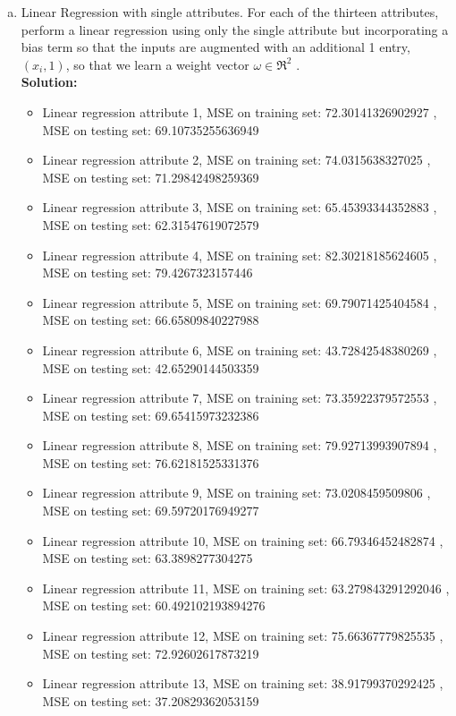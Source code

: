 \documentclass[A4,12pt]{article}
\begin{document}
\begin{enumerate}[4.]
\begin{enumerate}[a.]
    \item Linear Regression with single attributes. For each of the thirteen attributes, perform a linear regression using only the single attribute but incorporating a bias term so that the inputs are augmented with an additional 1 entry, $(x_i , 1)$, so that we learn a weight vector $\omega \in \Re^2$ .\\
    \textbf{Solution:} 
      \begin{itemize}
        \item Linear regression attribute 1, MSE on training set: 72.30141326902927 , MSE on testing set:  69.10735255636949
        \item Linear regression attribute 2, MSE on training set: 74.0315638327025 , MSE on testing set: 71.29842498259369
        \item Linear regression attribute 3, MSE on training set: 65.45393344352883 , MSE on testing set: 62.31547619072579
        \item Linear regression attribute 4, MSE on training set: 82.30218185624605 , MSE on testing set: 79.4267323157446 
        \item Linear regression attribute 5, MSE on training set: 69.79071425404584 , MSE on testing set: 66.65809840227988 
        \item Linear regression attribute 6, MSE on training set: 43.72842548380269 , MSE on testing set: 42.65290144503359 
        \item Linear regression attribute 7, MSE on training set: 73.35922379572553 , MSE on testing set: 69.65415973232386 
        \item Linear regression attribute 8, MSE on training set: 79.92713993907894 , MSE on testing set: 76.62181525331376 
        \item Linear regression attribute 9, MSE on training set: 73.0208459509806 , MSE on testing set:  69.59720176949277 
        \item Linear regression attribute 10, MSE on training set: 66.79346452482874 , MSE on testing set: 63.3898277304275 
        \item Linear regression attribute 11, MSE on training set: 63.279843291292046 , MSE on testing set: 60.492102193894276 
        \item Linear regression attribute 12, MSE on training set: 75.66367779825535 , MSE on testing set: 72.92602617873219 
        \item Linear regression attribute 13, MSE on training set: 38.91799370292425 , MSE on testing set: 37.20829362053159

\end{itemize}
\end{enumerate}
\end{enumerate}
\end{document}
